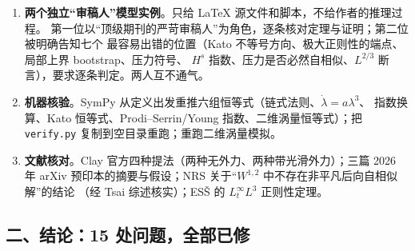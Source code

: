 \documentclass[11pt,a4paper]{article}
\begin{document}
\begin{enumerate}[leftmargin=1.6em]
\item \textbf{两个独立“审稿人”模型实例}。只给 \LaTeX{} 源文件和脚本，不给作者的推理过程。
      第一位以“顶级期刊的严苛审稿人”为角色，逐条核对定理与证明；第二位被明确告知七个
      最容易出错的位置（Kato 不等号方向、极大正则性的端点、局部上界 bootstrap、压力符号、
      $H^s$ 指数、压力是否必然自相似、$L^{2/3}$ 断言），要求逐条判定。两人互不通气。
\item \textbf{机器核验}。SymPy 从定义出发重推六组恒等式（链式法则、$\dot\lambda=a\lambda^3$、
      指数换算、Kato 恒等式、Prodi--Serrin/Young 指数、二维涡量恒等式）；把
      \texttt{verify.py} 复制到空目录重跑；重跑二维涡量模拟。
\item \textbf{文献核对}。Clay 官方四种提法（两种无外力、两种带光滑外力）；三篇 2026 年
      arXiv 预印本的摘要与假设；NRS 关于“$W^{1,2}$ 中不存在非平凡后向自相似解”的结论
      （经 Tsai 综述核实）；ES\v{S} 的 $L^\infty_tL^3$ 正则性定理。
\end{enumerate}

\subsection*{二、结论：15 处问题，全部已修}
\end{document}
